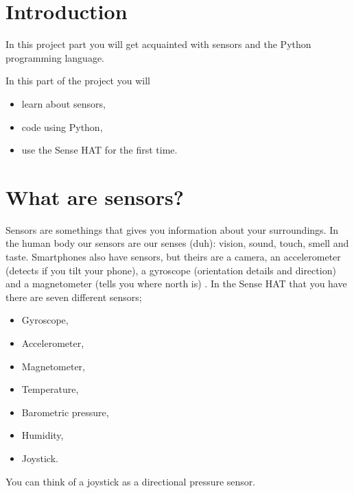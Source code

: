 \documentclass{article}
\begin{document}
\section{Introduction}
\noindent In this project part you will get acquainted with sensors and the Python programming language.

\noindent In this part of the project you will
\begin{itemize}
\item[1.] learn about sensors,
\item[2.] code using Python,
\item[3.] use the Sense HAT for the first time.
\end{itemize}

\section{What are sensors?}
Sensors are somethings that gives you information about your surroundings. In the human body our sensors are our senses (duh): vision, sound, touch, smell and taste. Smartphones also have sensors, but theirs are a camera, an accelerometer (detects if you tilt your phone), a gyroscope (orientation details and direction) and a magnetometer (tells you where north is) \cite{foss}. In the Sense HAT that you have there are seven different sensors;
\begin{itemize}
    \item Gyroscope,
    \item Accelerometer,
    \item Magnetometer,
    \item Temperature,
    \item Barometric pressure,
    \item Humidity,
    \item Joystick.
\end{itemize}
You can think of a joystick as a directional pressure sensor.
\end{document}
